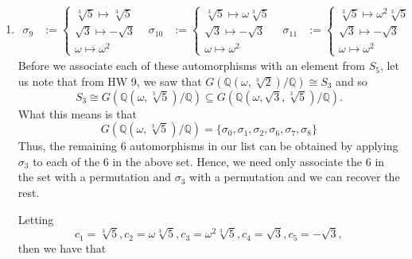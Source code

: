 \documentclass[12pt]{article}
\makeatletter
\theoremstyle{definition}
\theoremstyle{remark}
\newenvironment{solution}[1][\bf{\textit{Solution}}]{\par
  
  \normalfont \topsep6\p@\@plus6\p@\relax
  \list{}{\leftmargin=0mm
          \rightmargin=4mm
          \settowidth{\itemindent}{\itshape#1}%
          \labelwidth=\itemindent
          \parsep=0pt \listparindent=\parindent 
  }
  \item[\hskip\labelsep
        \itshape
    #1\@addpunct{.}]\ignorespaces
}{%
  \popQED\endlist\@endpefalse
}
\makeatother
\begin{document}
\begin{enumerate}[leftmargin=*]
\begin{enumerate}
\begin{solution}
\begin{align*}
\sigma_9&:=\begin{cases} \sqrt[3]{5}\mapsto\sqrt[3]{5}\\\sqrt{3}\mapsto-\sqrt{3}\\\omega\mapsto\omega^2\end{cases} & \sigma_{10}&:=\begin{cases}\sqrt[3]{5}\mapsto\omega\sqrt[3]{5}\\\sqrt{3}\mapsto-\sqrt{3}\\\omega\mapsto\omega^2 \end{cases} & \sigma_{11}&:=\begin{cases} \sqrt[3]{5}\mapsto\omega^2\sqrt[3]{5} \\\sqrt{3}\mapsto-\sqrt{3}\\\omega\mapsto\omega^2\end{cases}
                            \end{align*}
                        Before we associate each of these automorphisms with an element from $S_{5}$, let us note that from HW 9, we saw that $G(\mathbb{Q}(\omega,\sqrt[3]{2})/\mathbb{Q})\cong S_3$
                        and so 
                            \begin{equation*}
                                S_3\cong G(\mathbb{Q}(\omega,\sqrt[3]{5})/\mathbb{Q})\subseteq G(\mathbb{Q}(\omega,\sqrt{3},\sqrt[3]{5})/\mathbb{Q}).
                            \end{equation*}
                        What this means is that
                            \begin{equation*}
                                G(\mathbb{Q}(\omega,\sqrt[3]{5})/\mathbb{Q})=\{\sigma_0,\sigma_1,\sigma_2,\sigma_6,\sigma_7,\sigma_8\}
                            \end{equation*}
                        Thus, the remaining 6 automorphisms in our list can be obtained by applying $\sigma_3$ to each of the 6 in the above set. Hence, we need only associate the 6 in the set with a permutation and $\sigma_3$ with a permutation and we can recover the rest.\par\hspace{4mm} Letting
                            \begin{equation*}
                                c_1=\sqrt[3]{5},c_2=\omega\sqrt[3]{5},c_3=\omega^2\sqrt[3]{5},c_4=\sqrt{3},c_5=-\sqrt{3},
                            \end{equation*}
                        then we have that 
                            \begin{align*}

\end{align*}
\end{solution}
\end{enumerate}
\end{enumerate}
\end{document}
